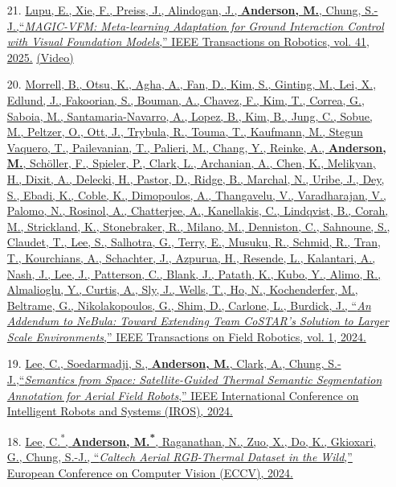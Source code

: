 \documentclass[12pt,letter,sans]{moderncv}        %
\begin{document}
\begin{itemize}

	\item [21.] \href{https://arxiv.org/pdf/2407.12304}
	{Lupu, E., Xie, F., Preiss, J., Alindogan, J.,  \underline{\textbf{Anderson, M.}}, Chung, S.-J.,``\textit{MAGIC-VFM: Meta-learning Adaptation for Ground Interaction Control with Visual Foundation Models},'' IEEE Transactions on Robotics, vol. 41, 2025.}
	\href{https://www.youtube.com/watch?v=sxM73ryweRA}{(Video)}

    \item [20.] \href{https://ieeexplore.ieee.org/document/10643435}
    {Morrell, B., Otsu, K., Agha, A., Fan, D., Kim, S., Ginting, M., Lei, X., Edlund, J., Fakoorian, S., Bouman, A., Chavez, F., Kim, T., Correa, G., Saboia, M., Santamaria-Navarro, A., Lopez, B., Kim, B., Jung, C., Sobue, M., Peltzer, O., Ott, J., Trybula, R., Touma, T., Kaufmann, M., Stegun Vaquero, T., Pailevanian, T., Palieri, M., Chang, Y., Reinke, A., \underline{\textbf{Anderson, M.}}, Sch\"{o}ller, F., Spieler, P., Clark, L., Archanian, A., Chen, K., Melikyan, H., Dixit, A., Delecki, H., Pastor, D., Ridge, B., Marchal, N., Uribe, J., Dey, S., Ebadi, K., Coble, K., Dimopoulos, A., Thangavelu, V., Varadharajan, V., Palomo, N., Rosinol, A., Chatterjee, A., Kanellakis, C., Lindqvist, B., Corah, M., Strickland, K., Stonebraker, R., Milano, M., Denniston, C., Sahnoune, S., Claudet, T., Lee, S., Salhotra, G., Terry, E., Musuku, R., Schmid, R., Tran, T., Kourchians, A., Schachter, J., Azpurua, H., Resende, L., Kalantari, A., Nash, J., Lee, J., Patterson, C., Blank, J., Patath, K., Kubo, Y., Alimo, R., Almalioglu, Y., Curtis, A., Sly, J., Wells, T., Ho, N., Kochenderfer, M., Beltrame, G., Nikolakopoulos, G., Shim, D., Carlone, L., Burdick, J., ``\textit{An Addendum to NeBula: Toward Extending Team CoSTAR's Solution to Larger Scale Environments},'' IEEE Transactions on Field Robotics, vol. 1, 2024.}
    
	\item [19.] \href{https://arxiv.org/pdf/2403.14056}
	{Lee, C., Soedarmadji, S.,  \underline{\textbf{Anderson, M.}}, Clark, A., Chung, S.-J.,``\textit{Semantics from Space: Satellite-Guided Thermal Semantic Segmentation Annotation for Aerial Field Robots},'' IEEE International Conference on Intelligent Robots and Systems (IROS), 2024.}

	\item [18.] \href{https://arxiv.org/pdf/2403.08997}
	{Lee, C.\textsuperscript{*}, \underline{\textbf{Anderson, M.\textsuperscript{*}}}, Raganathan, N., Zuo, X., Do, K., Gkioxari, G., Chung, S.-J., ``\textit{Caltech Aerial RGB-Thermal Dataset in the Wild},'' European Conference on Computer Vision (ECCV), 2024.}


\end{itemize}
\end{document}
